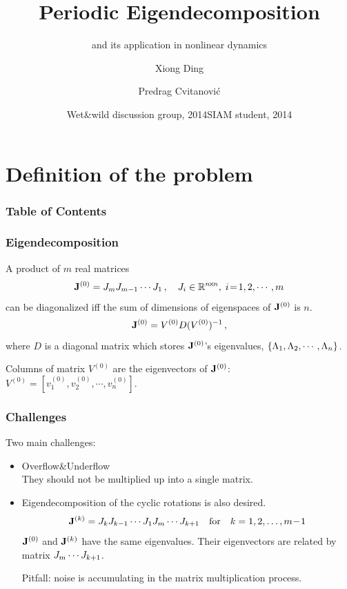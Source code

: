 \documentclass[mathserif, handout]{beamer}
\title[Periodic eigendecomposition] %
{Periodic Eigendecomposition}
\subtitle{and its application in nonlinear dynamics}
\author[Xiong, Predrag] %
{Xiong Ding\inst{1} \and Predrag Cvitanovi\'c\inst{1}}
\institute[Gatech] %
{
  \inst{1}%
  School of Physics\\
  Georgia Institute of Technology
}
\date[Wet\&wild 2014] %
{Wet\&wild discussion group, 2014}
\date[SIAM student 2014] %
{SIAM student, 2014}
\begin{document}
\frame{\titlepage} %

\section{Definition of the problem}

\begin{frame}
  \frametitle{Table of Contents}
  \tableofcontents[currentsection]
\end{frame}

\begin{frame}
  \frametitle{Eigendecomposition}
  A product of $m$ real matrices
  \begin{equation}
    \mathbf{J}^{(0)}=J_{m}J_{m-1}\cdots J_{1}\,,\quad
    J_{i}\in \mathbb{R}^{n\!\times\! n},\; i\!=\!1,2,\cdots,m
    \label{eq:problem}
  \end{equation}
  can be diagonalized iff the sum of dimensions of eigenspaces of 
  $\mathbf{J}^{(0)}$ is $n$.
  \begin{equation}
    \label{eq:diagonal}
    \mathbf{J}^{(0)}=V^{(0)}D(V^{(0)})^{-1}
    \,,
  \end{equation}
  where $D$ is a diagonal matrix which stores $\mathbf{J}^{(0)}$'s
  eigenvalues, $\{ \Lambda_{1},\Lambda_{2},\cdots,\Lambda_{n}\}$.

  Columns of matrix $V^{(0)}$ are the eigenvectors of $\mathbf{J}^{(0)}$:
  $V^{(0)}=[v^{(0)}_{1},v^{(0)}_{2},\cdots,v^{(0)}_{n}]$.
\end{frame}

\begin{frame}
  \frametitle{Challenges}
  Two main challenges:
  \begin{itemize}
  \item 
    {\color{green} Overflow\quad\&\quad Underflow} \\
    
    They should not be multiplied up into a single matrix.
    \pause
  \item 
    {\color{green} Eigendecomposition of the cyclic rotations is also desired.}\\
    
    \[
    \mathbf{J}^{(k)}=J_{k}J_{k-1}\cdots J_{1}J_{m}\cdots
    J_{k+1} \quad \text{for}\quad k=1,2,\dots,m\!-\!1
    \]
    $\mathbf{J}^{(0)}$ and $\mathbf{J}^{(k)}$ have the same eigenvalues.
    Their eigenvectors are related by matrix
    $J_{m}\cdots J_{k+1}$. 
    
    \vspace{1em}
    \pause
    
    Pitfall: noise is accumulating in the matrix multiplication process.
    
  \end{itemize}

\end{frame}
\end{document}
